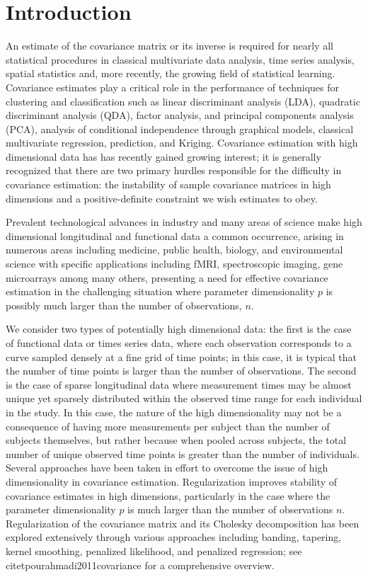 \documentclass[12pt]{article}
\theoremstyle{definition}
\begin{document}
\section{Introduction}

\indent

An estimate of the covariance matrix or its inverse is required for nearly all statistical procedures in classical multivariate data analysis, time series analysis, spatial statistics and, more recently, the growing field of statistical learning. Covariance estimates play a critical role in the performance of techniques for clustering and classification such as linear discriminant analysis (LDA), quadratic discriminant analysis (QDA), factor analysis, and principal components analysis (PCA), analysis of conditional independence through graphical models, classical multivariate regression, prediction, and Kriging. Covariance estimation with high dimensional data has has recently gained growing interest; it is generally recognized that there are two primary hurdles responsible for the difficulty in covariance estimation: the instability of sample covariance matrices in high dimensions and a positive-definite constraint we wish estimates to obey.

\bigskip

Prevalent technological advances in industry and many areas of science make high dimensional longitudinal and functional data a common occurrence, arising in numerous areas including medicine, public health, biology, and environmental science with specific applications including fMRI, spectroscopic imaging, gene microarrays among many others, presenting a need for effective covariance estimation in the challenging situation where parameter dimensionality $p$ is possibly much larger than the number of observations, $n$. 

\bigskip

We consider two types of potentially high dimensional data: the first is the case of functional data or times series data, where each observation corresponds to a curve sampled densely at a fine grid of time points; in this case, it is typical that the number of time points is larger than the number of observations. The second is the case of sparse longitudinal data where measurement times may be almost unique yet sparsely distributed within the observed time range for each individual in the study. In this case, the nature of the high dimensionality may not be a consequence of having more measurements per subject than the number of subjects themselves, but rather because when pooled across subjects, the total number of unique observed time points is greater than the number of individuals.  Several approaches have been taken in effort to overcome the issue of high dimensionality in covariance estimation. Regularization improves stability of covariance estimates in high dimensions, particularly in the case where the parameter dimensionality $p$ is much larger than the number of observations $n$. Regularization of the covariance matrix and its Cholesky decomposition has been explored extensively through various approaches including banding, tapering, kernel smoothing, penalized likelihood, and penalized regression; see citet{pourahmadi2011covariance} for a comprehensive overview. 
\end{document}
